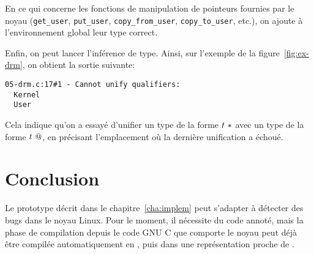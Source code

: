 En ce qui concerne les fonctions de manipulation de pointeurs fournies
par le noyau (\texttt{get\_user}, \texttt{put\_user},
\texttt{copy\_from\_user}, \texttt{copy\_to\_user}, etc.), on ajoute à
l'environnement global leur type correct.

Enfin, on peut lancer l'inférence de type. Ainsi, sur l'exemple de la
figure~\ref{fig:ex-drm}, on obtient la sortie suivante:

\begin{Verbatim}
05-drm.c:17#1 - Cannot unify qualifiers:
  Kernel
  User
\end{Verbatim}

Cela indique qu'on a essayé d'unifier un type de la forme $t~*$ avec un
type de la forme $t~@$, en précisant l'emplacement où la dernière
unification a échoué.

\section*{Conclusion}

Le prototype décrit dans le chapitre~\ref{cha:implem} peut s'adapter à détecter
des bugs dans le noyau Linux. Pour le moment, il nécessite du code annoté, mais
la phase de compilation depuis le code GNU C que comporte le noyau peut déjà
être compilée automatiquement en \newspeak, puis dans une représentation proche
de \langname.



